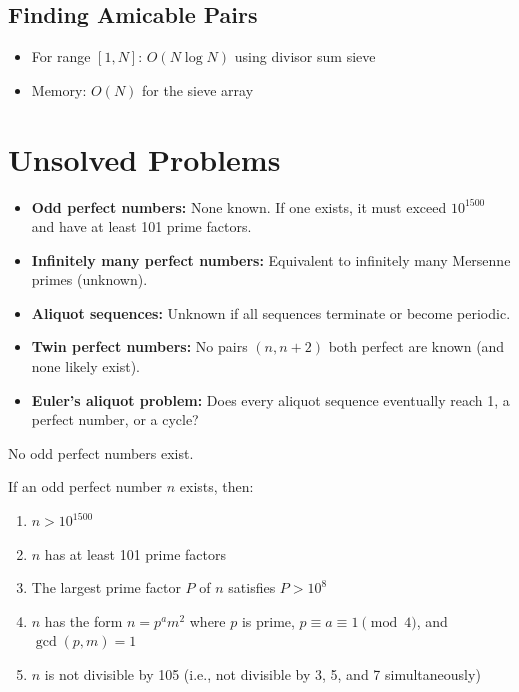 \subsection{Finding Amicable Pairs}
\begin{itemize}
    \item For range $[1, N]$: $O(N \log N)$ using divisor sum sieve
    \item Memory: $O(N)$ for the sieve array
\end{itemize}

\section{Unsolved Problems}

\begin{itemize}
\item \textbf{Odd perfect numbers:} None known. If one exists, it must exceed $10^{1500}$ and have at least 101 prime factors.
\item \textbf{Infinitely many perfect numbers:} Equivalent to infinitely many Mersenne primes (unknown).
\item \textbf{Aliquot sequences:} Unknown if all sequences terminate or become periodic.
\item \textbf{Twin perfect numbers:} No pairs $(n, n+2)$ both perfect are known (and none likely exist).
\item \textbf{Euler's aliquot problem:} Does every aliquot sequence eventually reach 1, a perfect number, or a cycle?
\end{itemize}

\begin{conjecture}
No odd perfect numbers exist.
\end{conjecture}

\begin{theorem}
If an odd perfect number $n$ exists, then:
\begin{enumerate}
    \item $n > 10^{1500}$
    \item $n$ has at least 101 prime factors
    \item The largest prime factor $P$ of $n$ satisfies $P > 10^8$
    \item $n$ has the form $n = p^a m^2$ where $p$ is prime, $p \equiv a \equiv 1 \pmod{4}$, and $\gcd(p, m) = 1$
    \item $n$ is not divisible by 105 (i.e., not divisible by 3, 5, and 7 simultaneously)
\end{enumerate}
\end{theorem}

